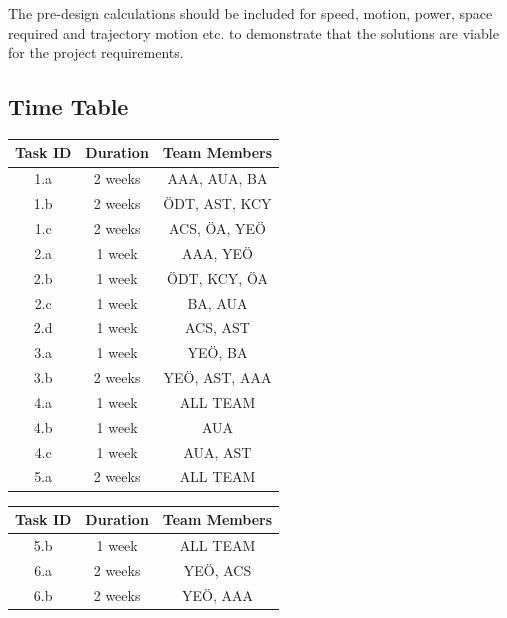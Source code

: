 \documentclass[12pt]{report}
\begin{document}
The pre-design calculations should be included for speed, motion, power, space required and trajectory motion etc. to demonstrate that the solutions are viable for the project requirements. 
\newpage


\subsection{Time Table}

\begin{table}[h!]
\centering
\begin{minipage}{0.45\textwidth}
    \centering
    \scriptsize
    \begin{tabular}{|c|c|c|}
    \hline
    \textbf{Task ID} & \textbf{Duration} & \textbf{Team Members} \\
    \hline
    1.a & 2 weeks & AAA, AUA, BA \\
    1.b & 2 weeks & ÖDT, AST, KCY \\
    1.c & 2 weeks & ACS, ÖA, YEÖ \\
    2.a & 1 week & AAA, YEÖ \\
    2.b & 1 week & ÖDT, KCY, ÖA \\
    2.c & 1 week & BA, AUA \\
    2.d & 1 week & ACS, AST \\
    3.a & 1 week & YEÖ, BA \\
    3.b & 2 weeks & YEÖ, AST, AAA \\
    4.a & 1 week & ALL TEAM \\
    4.b & 1 week & AUA \\
    4.c & 1 week & AUA, AST \\
    5.a & 2 weeks & ALL TEAM \\
    \hline
    \end{tabular}
\end{minipage}%
\hfill
\begin{minipage}{0.45\textwidth}
    \centering
    \scriptsize
    \begin{tabular}{|c|c|c|}
    \hline
    \textbf{Task ID} & \textbf{Duration} & \textbf{Team Members} \\
    \hline
    5.b & 1 week & ALL TEAM \\
    6.a & 2 weeks & YEÖ, ACS \\
    6.b & 2 weeks & YEÖ, AAA \\

\end{tabular}
\end{minipage}
\end{table}
\end{document}
